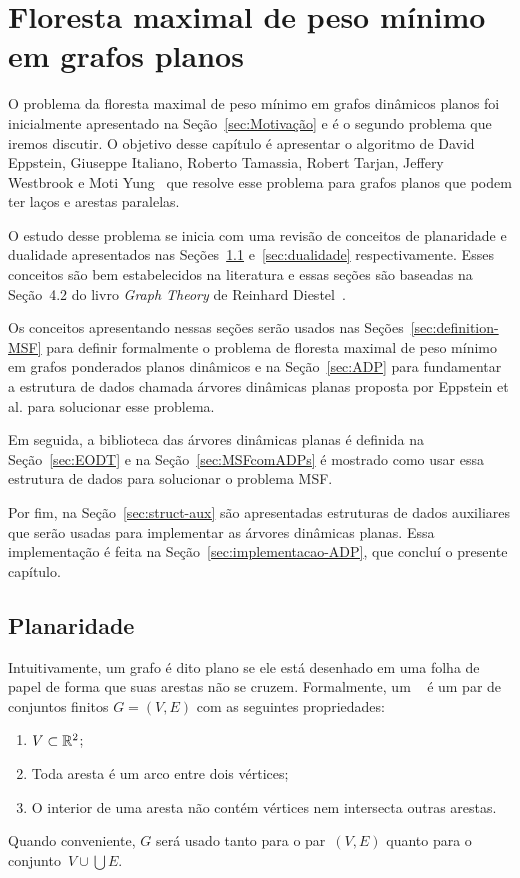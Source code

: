 \chapter{Floresta maximal de peso mínimo em grafos planos}
\label{sec:MSF}

O problema da floresta maximal de peso mínimo em grafos dinâmicos planos foi inicialmente apresentado na Seção~\ref{sec:Motivação} e é o segundo problema que iremos discutir.
O objetivo desse capítulo é apresentar o algoritmo de David Eppstein, Giuseppe Italiano, Roberto Tamassia, Robert Tarjan, Jeffery Westbrook e Moti Yung~\cite{EPPSTEIN-planar} que resolve esse problema para grafos planos que podem ter laços e arestas paralelas.

O estudo desse problema se inicia com uma revisão de conceitos de planaridade e dualidade apresentados nas Seções~\ref{sec:planaridade} e~\ref{sec:dualidade} respectivamente.
Esses conceitos são bem estabelecidos na literatura e essas seções são baseadas na Seção~4.2 do livro \textit{Graph Theory} de Reinhard Diestel~\cite{Diestel}.

Os conceitos apresentando nessas seções serão usados nas Seções~\ref{sec:definition-MSF} para definir formalmente o problema de floresta maximal de peso mínimo em grafos ponderados planos dinâmicos e na Seção~\ref{sec:ADP} para fundamentar a estrutura de dados chamada árvores dinâmicas planas proposta por Eppstein et al. para solucionar esse problema.

Em seguida, a biblioteca das árvores dinâmicas planas é definida na Seção~\ref{sec:EODT} e na Seção~\ref{sec:MSFcomADPs} é mostrado como usar essa estrutura de dados para solucionar o problema MSF.

Por fim, na Seção~\ref{sec:struct-aux} são apresentadas estruturas de dados auxiliares que serão usadas para implementar as árvores dinâmicas planas. Essa implementação é feita na Seção~\ref{sec:implementacao-ADP}, que concluí o presente capítulo.

\section{Planaridade}
\label{sec:planaridade}

Intuitivamente, um grafo é dito plano se ele está desenhado em uma folha de papel de forma que suas arestas não se cruzem.
Formalmente, um ~\cite{Diestel} é um par de conjuntos finitos $G = (V, E)$ com as seguintes propriedades:
\begin{enumerate}
\item $V\subset \mathbb{R}^2$;
\item Toda aresta é um arco entre dois vértices;
\item O interior de uma aresta não contém vértices nem intersecta outras arestas.
\end{enumerate}
Quando conveniente, $G$ será usado tanto para o par~$(V ,E)$ quanto para o conjunto~${V\cup\bigcup E}$.

